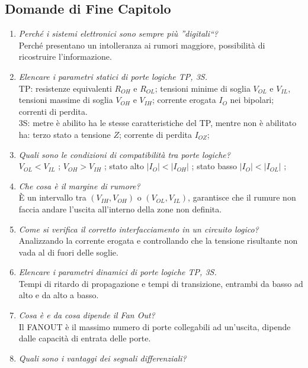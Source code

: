 \documentclass[12pt]{article}
\begin{document}
\subsection{Domande di Fine Capitolo}
\begin{enumerate}
    \item \emph{Perché i sistemi elettronici sono sempre più ''digitali``?} \\
        Perch\'e  presentano un intolleranza ai rumori maggiore, possibilit\`a di ricostruire l'informazione.
    \item \emph{Elencare i parametri statici di porte logiche TP, 3S.} \\
        TP: resistenze equivalenti $R_{OH}$ e $R_{OL}$; tensioni minime di soglia $V_{OL}$ e $V_{IL}$, tensioni massime di soglia $V_{OH}$ e $V_{IH}$; corrente erogata $I_O$ nei bipolari; correnti di perdita. \\
        3S: metre \`e abilito ha le stesse caratteristiche del TP, mentre non \`e abilitato ha: terzo stato a tensione $Z$; corrente di perdita $I_{OZ}$;
    \item \emph{Quali sono le condizioni di compatibilità tra porte logiche?} \\
        $V_{OL} < V_{IL}$ ; $V_{OH} > V_{IH}$ ; stato alto $|I_O| < |I_{OH}|$ ; stato basso $|I_O| < |I_{OL}|$ ;
    \item \emph{Che cosa è il margine di rumore?} \\
        \`E un intervallo tra $(V_{IH}, V_{OH})$ o $(V_{OL}, V_{IL})$, garantisce che il rumure non faccia andare l'uscita all'interno della zone non definita.
    \item \emph{Come si verifica il corretto interfacciamento in un circuito logico?} \\
        Analizzando la corrente erogata e controllando che la tensione risultante non vada al di fuori delle soglie.
    \item \emph{Elencare i parametri dinamici di porte logiche TP, 3S.} \\
        Tempi di ritardo di propagazione e tempi di transizione, entrambi da basso ad alto e da alto a basso.
    \item \emph{Cosa è e da cosa dipende il Fan Out?} \\
        Il FANOUT \`e il massimo numero di porte collegabili ad un'uscita, dipende dalle capacit\`a di entrata delle porte.
    \item \emph{Quali sono i vantaggi dei segnali differenziali?} \\

\end{enumerate}
\end{document}
